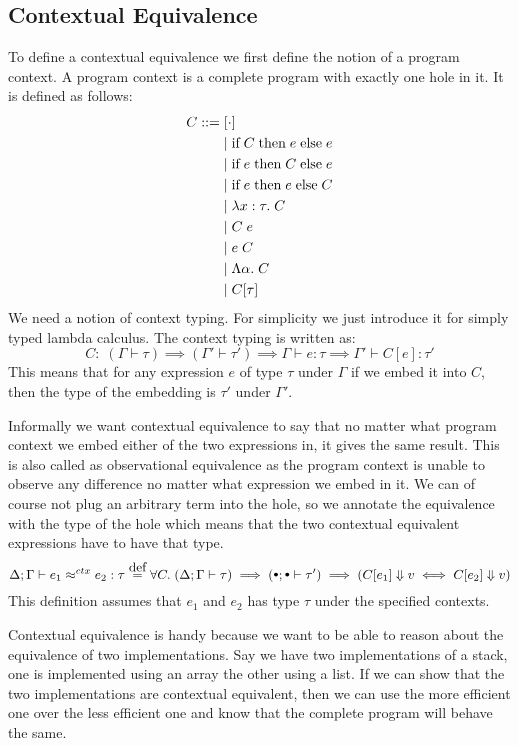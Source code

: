 \subsection*{Contextual Equivalence}
To define a contextual equivalence we first define the notion of a program context. A program context is a complete program with exactly one hole in it. It is defined as follows:
\begin{align*}
  C ::= &\;  [\cdot] \\
        &\; | \;  \text{if}\; C \; \text{then} \; e \; \text{else} \; e  \\
        &\; | \;  \text{if}\; e \; \text{then} \; C \; \text{else} \; e \\
        &\; | \;  \text{if}\; e \; \text{then} \; e \; \text{else} \; C \\
        &\; | \; \lambda x : \tau . \; C \\
        &\; | \; C \; e \\
        &\; | \; e \; C \\
        &\; | \; \Lambda \alpha . \; C \\
        &\; | \; C[\tau]
\end{align*}
We need a notion of context typing. For simplicity we just introduce it for simply typed lambda calculus. The context typing is written as:
\[
C:\; (\Gamma \vdash \tau) \implies (\Gamma' \vdash \tau') \implies \Gamma \vdash e : \tau \implies \Gamma' \vdash C[e] : \tau'
\]
This means that for any expression $e$ of type $\tau$ under $\Gamma$ if we embed it into $C$, then the type of the embedding is $\tau'$ under $\Gamma'$.

Informally we want contextual equivalence to say that no matter what program context we embed either of the two expressions in, it gives the same result. This is also called as observational equivalence as the program context is unable to observe any difference no matter what expression we embed in it. We can of course not plug an arbitrary term into the hole, so we annotate the equivalence with the type of the hole which means that the two contextual equivalent expressions have to have that type.
\[
  \Delta; \Gamma \vdash \ctxeq{e_1}{e_2} : \tau \eqdef \forall C.\; (\Delta ; \Gamma \vdash \tau ) \implies (\mtenv ; \mtenv \vdash \tau') \implies (C[e_1] \Downarrow v \iff C[e_2] \Downarrow v)
\]
This definition assumes that $e_1$ and $e_2$ has type $\tau$ under the specified contexts.

Contextual equivalence is handy because we want to be able to reason about the equivalence of two implementations. Say we have two implementations of a stack, one is implemented using an array the other using a list. If we can show that the two implementations are contextual equivalent, then we can use the more efficient one over the less efficient one and know that the complete program will behave the same.

